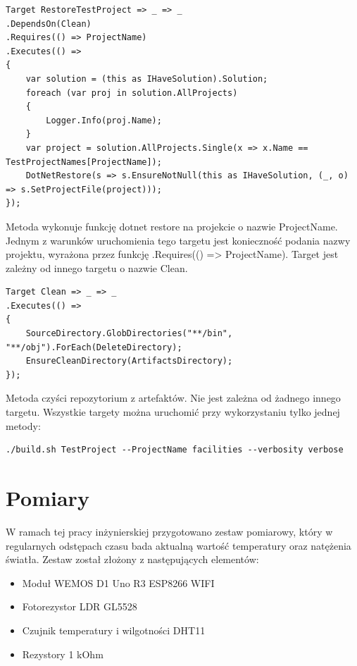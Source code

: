 \documentclass[11pt, a4]{article} %
\begin{document}
\begin{lstlisting}
Target RestoreTestProject => _ => _
.DependsOn(Clean)
.Requires(() => ProjectName)
.Executes(() =>
{
    var solution = (this as IHaveSolution).Solution;
    foreach (var proj in solution.AllProjects)
    {
        Logger.Info(proj.Name);
    }
    var project = solution.AllProjects.Single(x => x.Name == TestProjectNames[ProjectName]);
    DotNetRestore(s => s.EnsureNotNull(this as IHaveSolution, (_, o) => s.SetProjectFile(project)));
});
\end{lstlisting}

Metoda wykonuje funkcję dotnet restore na projekcie o nazwie ProjectName. Jednym z 
warunków uruchomienia tego targetu jest konieczność podania nazwy projektu, wyrażona 
przez funkcję .Requires(() => ProjectName). Target jest zależny od innego targetu o 
nazwie Clean.

\begin{lstlisting}
Target Clean => _ => _
.Executes(() =>
{
    SourceDirectory.GlobDirectories("**/bin", "**/obj").ForEach(DeleteDirectory);
    EnsureCleanDirectory(ArtifactsDirectory);
});
\end{lstlisting}

Metoda czyści repozytorium z artefaktów. Nie jest zależna od żadnego innego targetu.
Wszystkie targety można uruchomić przy wykorzystaniu tylko jednej metody:

\begin{lstlisting}
./build.sh TestProject --ProjectName facilities --verbosity verbose
\end{lstlisting}

\section{Pomiary}

W ramach tej pracy inżynierskiej przygotowano zestaw pomiarowy, który 
w regularnych odstępach czasu bada aktualną wartość temperatury oraz
natężenia światła. Zestaw został złożony z następujących elementów:

\begin{itemize} %
    \item Moduł WEMOS D1 Uno R3 ESP8266 WIFI
    \item Fotorezystor LDR GL5528
    \item Czujnik temperatury i wilgotności DHT11
    \item Rezystory 1 kOhm
\end{itemize}
\end{document}
